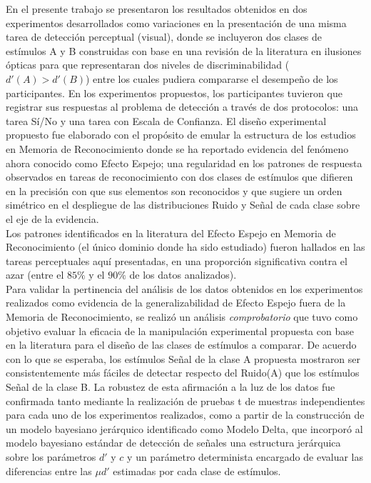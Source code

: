\documentclass[jou,apacite]{apa6}
\begin{document}
En el presente trabajo se presentaron los resultados obtenidos en dos experimentos desarrollados como variaciones en la presentación de una misma tarea de detección perceptual (visual), donde se incluyeron dos clases de estímulos A y B construidas con base en una revisión de la literatura en ilusiones ópticas para que representaran dos niveles de discriminabilidad ($d'(A)>d'(B)$) entre los cuales pudiera compararse el desempeño de los participantes. En los experimentos propuestos, los participantes tuvieron que registrar sus respuestas al problema de detección a través de dos protocolos: una tarea Sí/No y una tarea con Escala de Confianza. El diseño experimental propuesto fue elaborado con el propósito de emular la estructura de los estudios en Memoria de Reconocimiento donde se ha reportado evidencia del fenómeno ahora conocido como Efecto Espejo; una regularidad en los patrones de respuesta observados en tareas de reconocimiento con dos clases de estímulos que difieren en la precisión con que sus elementos son reconocidos y que sugiere un orden simétrico en el despliegue de las distribuciones Ruido y Señal de cada clase sobre el eje de la evidencia.\\

Los patrones identificados en la literatura del Efecto Espejo en Memoria de Reconocimiento (el único dominio donde ha sido estudiado) fueron hallados en las tareas perceptuales aquí presentadas, en una proporción significativa contra el azar (entre el $85\%$ y el $90\%$ de los datos analizados).\\

Para validar la pertinencia del análisis de los datos obtenidos en los experimentos realizados como evidencia de la generalizabilidad de Efecto Espejo fuera de la Memoria de Reconocimiento, se realizó un análisis \textit{comprobatorio} que tuvo como objetivo evaluar la eficacia de la manipulación experimental propuesta con base en la literatura para el diseño de las clases de estímulos a comparar. De acuerdo con lo que se esperaba, los estímulos Señal de la clase A propuesta mostraron ser consistentemente más fáciles de detectar respecto del Ruido(A) que los estímulos Señal de la clase B. La robustez de esta afirmación a la luz de los datos fue confirmada tanto mediante la realización de pruebas t de muestras independientes para cada uno de los experimentos realizados, como a partir de la construcción de un modelo bayesiano jerárquico identificado como Modelo Delta, que incorporó al modelo bayesiano estándar de detección de señales una estructura jerárquica sobre los parámetros $d'$ y $c$ y un parámetro determinista encargado de evaluar las diferencias entre las $\mu d'$ estimadas por cada clase de estímulos.\\
\end{document}
